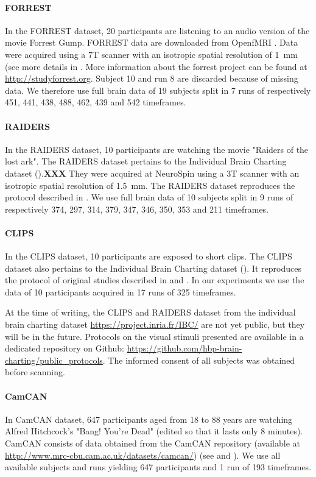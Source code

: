 \paragraph{FORREST}
In the FORREST dataset, 20 participants are listening to an audio version of the movie Forrest Gump.
%
FORREST data are downloaded from OpenfMRI \cite{poldrack2013toward}. 
%
Data were acquired using a 7T scanner with an isotropic spatial resolution of 1 mm (see more details in \cite{hanke2014high}.
%
More information about the forrest project can be found at \url{http://studyforrest.org}.
%
Subject 10 and run 8 are discarded because of missing data.
%
We therefore use full brain data of 19 subjects split in 7 runs of respectively 451, 441, 438, 488, 462, 439 and 542 timeframes.
 
\paragraph{RAIDERS}
In the RAIDERS dataset, 10 participants are watching the movie "Raiders of the lost ark".
% 
The RAIDERS dataset pertains to the Individual Brain Charting dataset (\cite{ibc}).\textbf{XXX}
% 
They were acquired at NeuroSpin using a 3T scanner with an isotropic spatial resolution of 1.5 mm.
% 
The RAIDERS dataset reproduces the protocol described in \cite{haxby2011common}.
%
We use full brain data of 10 subjects split in 9 runs of respectively 374, 297, 314, 379, 347, 346, 350, 353 and 211 timeframes.

\paragraph{CLIPS}
In the CLIPS dataset, 10 participants are exposed to short clips. 
%
The CLIPS dataset also pertains to the Individual Brain Charting dataset (\cite{ibc}).
%
It reproduces the protocol of original studies described in \cite{nishimoto2011reconstructing} and \cite{huth2012continuous}.
%
In our experiments we use the data of 10 participants acquired in 17 runs of 325 timeframes.

At the time of writing, the CLIPS and RAIDERS dataset from the individual brain charting dataset \url{https://project.inria.fr/IBC/} are not yet public, but they will be in the future. Protocols on the visual stimuli presented are available in a dedicated repository on Github: \url{https://github.com/hbp-brain-charting/public_protocols}. The informed consent of all subjects was obtained before scanning.

\paragraph{CamCAN}
In CamCAN dataset, 647 participants aged from 18 to 88 years are watching Alfred Hitchcock's "Bang! You're Dead" (edited so that it lasts only 8 minutes).
%
CamCAN consists of data obtained from the CamCAN repository (available at \url{http://www.mrc-cbu.cam.ac.uk/datasets/camcan/}) (see \cite{taylor2017cambridge} and \cite{shafto2014cambridge}).
%
We use all available subjects and runs yielding 647 participants and 1 run of 193 timeframes.

